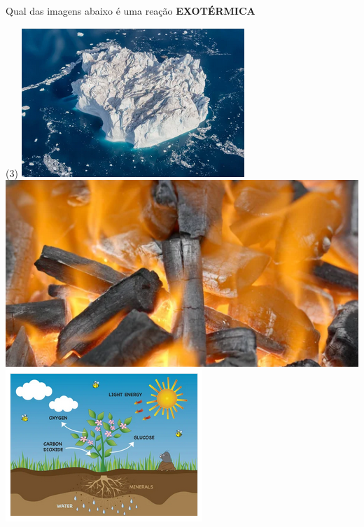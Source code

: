 \documentclass[11pt]{article}
\begin{document}
\begin{exercise}
Qual das imagens abaixo é uma reação \textbf{EXOTÉRMICA}

\begin{choice}(3)
\choice \includegraphics[scale=.4]{Adaptadas/gelo.png}
\choice \includegraphics[scale=.3]{Adaptadas/carvao.png}
\choice \includegraphics[scale=.5]{Adaptadas/fotosintesse.png}
\end{choice}
\end{exercise}
\end{document}
